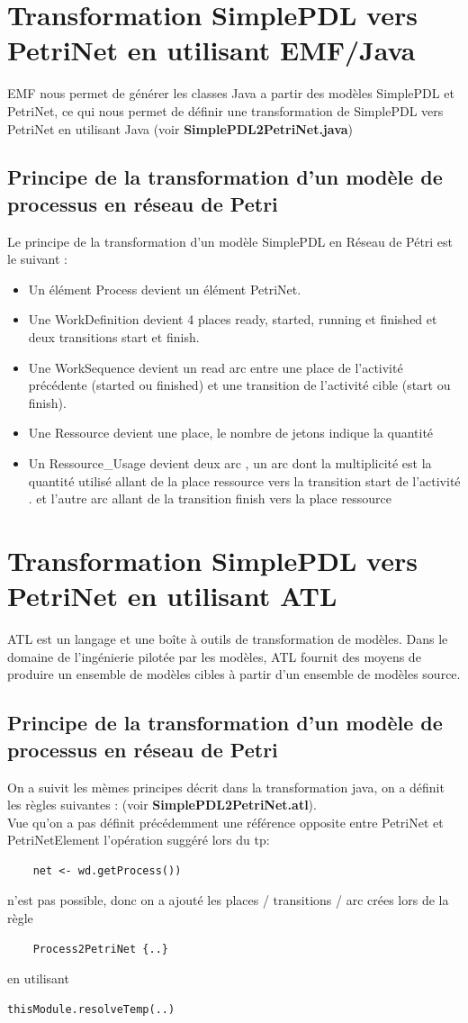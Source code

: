 \documentclass{article}
\begin{document}
\section{Transformation SimplePDL vers PetriNet en utilisant EMF/Java}
EMF nous permet de générer les classes Java a partir des modèles SimplePDL et PetriNet, ce qui nous permet de définir une transformation
de SimplePDL vers PetriNet en utilisant Java (voir \textbf{SimplePDL2PetriNet.java})
\subsection{Principe de la transformation d’un modèle de processus en réseau de Petri}
Le principe de la transformation d’un modèle SimplePDL en Réseau de Pétri est le suivant :
\begin{itemize}
    \item Un élément Process devient un élément PetriNet.
    \item Une WorkDefinition devient 4 places ready, started, running et finished et deux transitions start et finish.
    \item Une WorkSequence devient un read arc entre une place de l’activité précédente (started ou finished) et une transition de l’activité cible (start ou finish).
    \item Une Ressource devient une place, le nombre de jetons indique la quantité
    \item Un Ressource\_Usage devient deux arc , un arc dont la multiplicité est la quantité utilisé allant de la place ressource vers la transition start de l'activité . et l'autre arc allant de la transition finish vers la place ressource
\end{itemize}

\section{Transformation SimplePDL vers PetriNet en utilisant ATL}
ATL est un langage et une boîte à outils de transformation de modèles. Dans le domaine de l'ingénierie pilotée par les modèles, 
ATL fournit des moyens de produire un ensemble de modèles cibles à partir d'un ensemble de modèles source.
\subsection{Principe de la transformation d’un modèle de processus en réseau de Petri}
On a suivit les mèmes principes décrit dans la transformation java, on a définit les règles suivantes : (voir \textbf{SimplePDL2PetriNet.atl}). \\
Vue qu'on a pas définit précédemment une référence opposite entre PetriNet et PetriNetElement l'opération suggéré lors du tp: 
\begin{verbatim}
    net <- wd.getProcess())
\end{verbatim}
n'est pas possible, donc on a ajouté les places / transitions / arc crées lors de la règle 
\begin{verbatim}
    Process2PetriNet {..}
\end{verbatim}
en utilisant 
\begin{verbatim}
thisModule.resolveTemp(..)
\end{verbatim}
\end{document}
